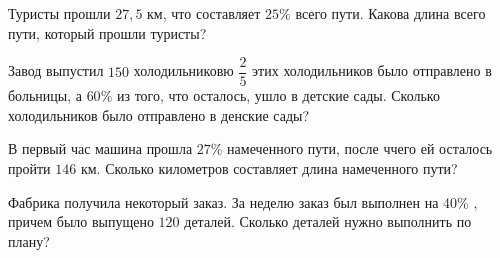\begin{class}[number=7]
\begin{listofex}
		\item Туристы прошли \( 27,5 \) км, что составляет \( 25\% \) всего пути. Какова длина всего пути, который прошли туристы?
		\item Завод выпустил \( 150 \) холодильниковю \( \dfrac{2}{5} \) этих холодильников было отправлено в больницы, а \( 60\% \) из того, что осталось, ушло в детские сады. Сколько  холодильников было отправлено в денские сады?
		\item В первый час машина прошла \( 27\% \) намеченного пути, после ччего ей осталось пройти \( 146 \) км. Сколько километров составляет длина намеченного пути?
		\item Фабрика получила некоторый заказ. За неделю заказ был выполнен на \( 40\% \) , причем было выпущено \( 120 \) деталей. Сколько деталей нужно выполнить по плану?
	\end{listofex}
\end{class}

